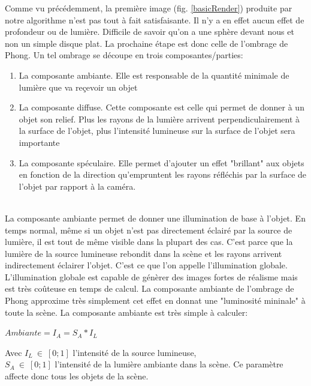 \documentclass[11pt]{article}
\begin{document}
Comme vu précédemment, la première image (fig. \ref{basicRender}) produite par notre algorithme n'est pas tout à fait satisfaisante. Il n'y a en effet aucun effet de profondeur ou de lumière. Difficile de savoir qu'on a une sphère devant nous et non un simple disque plat. La prochaine étape est donc celle de l'ombrage de Phong. Un tel ombrage se découpe en trois composantes/parties:
\begin{enumerate}
	\item{La composante ambiante. Elle est responsable de la quantité minimale de lumière que va reçevoir un objet}
	\item{La composante diffuse. Cette composante est celle qui permet de donner à un objet son relief. Plus les rayons de la lumière arrivent perpendiculairement à la surface de l'objet, plus l'intensité lumineuse sur la surface de l'objet sera importante}
	\item{La composante spéculaire. Elle permet d'ajouter un effet "brillant" aux objets en fonction de la direction qu'empruntent les rayons réfléchis par la surface de l'objet par rapport à la caméra.}
\end{enumerate}

\hfill\\
\indent La composante ambiante permet de donner une illumination de base à l'objet. En temps normal, même si un objet n'est pas directement éclairé par la source de lumière, il est tout de même visible dans la plupart des cas. C'est parce que la lumière de la source lumineuse rebondit dans la scène et les rayons arrivent indirectement éclairer l'objet. C'est ce que l'on appelle l'illumination globale. L'illumination globale est capable de génèrer des images fortes de réalisme mais est très coûteuse en temps de calcul. La composante ambiante de l'ombrage de Phong approxime très simplement cet effet en donnat une "luminosité mininale" à toute la scène. La composante ambiante est très simple à calculer:\\

\begin{center}
	$Ambiante = I_A = S_A*I_L$
\end{center}
Avec $I_L\ \in\ [0;1]$ l'intensité de la source lumineuse,\\
$S_A\ \in\ [0; 1]$ l'intensité de la lumière ambiante dans la scène. Ce paramètre affecte donc tous les objets de la scène.
\end{document}
